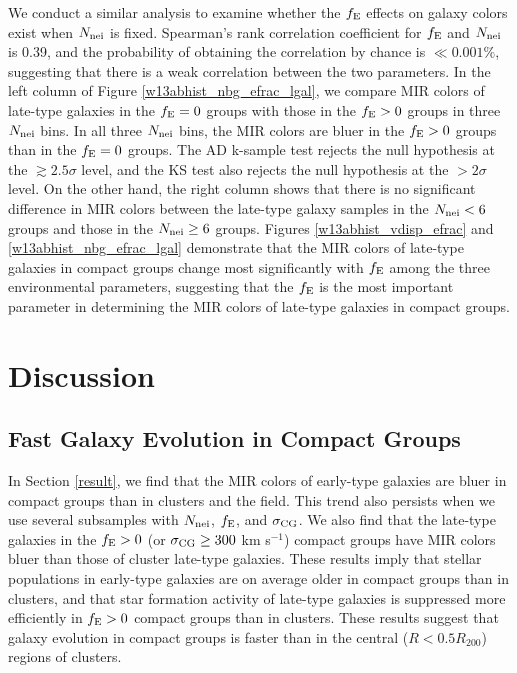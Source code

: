 \documentclass[12pt,preprint,apj]{emulateapj}
\newcommand{\efrac}{f_{\rm E}}
\newcommand{\nbg}{N_{\rm nei}}
\begin{document}
We conduct a similar analysis  
to examine whether the $\efrac$ effects 
on galaxy colors exist when $\nbg$ is fixed. 
Spearman's rank correlation coefficient for $\efrac$ and $\nbg$ is 
0.39, and the probability of obtaining the correlation by chance is $\ll0.001\%$, 
suggesting that there is a weak correlation between the two parameters.
In the left column of Figure \ref{w13abhist_nbg_efrac_lgal}, 
we compare MIR colors of late-type galaxies in the $\efrac=0$ groups with 
those in the $\efrac>0$ groups in three $\nbg$ bins.
In all three $\nbg$ bins, the MIR colors are bluer in the $\efrac>0$ groups than 
in the $\efrac=0$ groups. 
The AD k-sample test rejects the null hypothesis at the $\gtrsim2.5\sigma$ level, 
and the KS test also rejects the null hypothesis at the $>2\sigma$ level. 
On the other hand, the right column shows that there is no significant difference 
in MIR colors between the late-type galaxy samples in the $\nbg<6$ groups and 
those in the $\nbg\geq6$ groups. 
Figures \ref{w13abhist_vdisp_efrac} and \ref{w13abhist_nbg_efrac_lgal}
demonstrate that the MIR colors of late-type galaxies in compact groups change 
most significantly with $\efrac$ among the three environmental parameters,
suggesting that the $\efrac$ is the most important parameter in determining 
the MIR colors of late-type galaxies in compact groups.




\section{Discussion}\label{discuss}

\subsection{Fast Galaxy Evolution in Compact Groups}

In Section \ref{result}, we find that the MIR colors of early-type galaxies 
are bluer in compact groups than in clusters and the field. 
This trend also persists when we use several subsamples with $\nbg$, $\efrac$, 
and $\sigma_{\rm CG}$.
We also find that the late-type galaxies in the $\efrac>0$ 
(or $\sigma_{\rm CG}\geq300$ km s$^{-1}$) compact groups have MIR colors 
bluer than those of cluster late-type galaxies. 
These results imply that stellar populations in early-type galaxies 
are on average older in compact groups than in clusters, and that 
star formation activity of late-type galaxies is suppressed more efficiently 
in $\efrac>0$ compact groups than in clusters. 
These results suggest that galaxy evolution in compact groups is faster 
than in the central ($R<0.5R_{200}$) regions of clusters.
\end{document}
